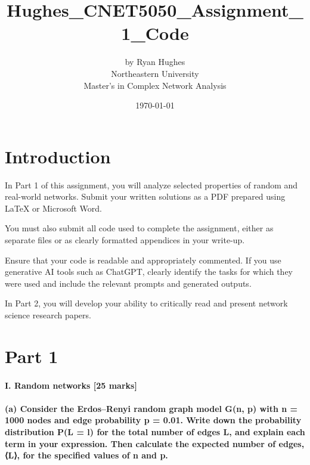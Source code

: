 \documentclass[11pt]{article}
\title{Hughes\_CNET5050\_Assignment\_1\_Code}
\author{by Ryan Hughes\\ Northeastern University\\ Master's in Complex Network Analysis}
\date{\today}
\begin{document}
    
    \maketitle

    \section*{Introduction}\label{introduction.}

    In Part 1 of this assignment, you will analyze selected properties of
random and real-world networks. Submit your written solutions as a PDF
prepared using LaTeX or Microsoft Word.

You must also submit all code used to complete the assignment, either as
separate files or as clearly formatted appendices in your write-up.

Ensure that your code is readable and appropriately commented. If you
use generative AI tools such as ChatGPT, clearly identify the tasks for
which they were used and include the relevant prompts and generated
outputs.

In Part 2, you will develop your ability to critically read and present
network science research papers.

\section*{Part 1}\label{part-1}

\paragraph{I. Random networks {[}25
marks{]}}\label{i.-random-networks-25-marks}

\paragraph{(a) Consider the Erdos--Renyi random graph model G(n, p) with n =
1000 nodes and edge probability p = 0.01. Write down the probability
distribution P(L = l) for the total number of edges L, and explain each
term in your expression. Then calculate the expected number of edges,
⟨L⟩, for the specified values of n and
p.\newline \newline}\label{consider-the-erdosrenyi-random-graph-model-gn-p-with-n-1000-nodes-and-edge-probability-p-0.01.a-write-down-the-probability-distribution-pl-l-for-the-total-number-of-edges-l-and-explain-each-term-in-your-expression.-then-calculate-the-expected-number-of-edges-l-for-the-specified-values-of-n-and-p.}
\end{document}

